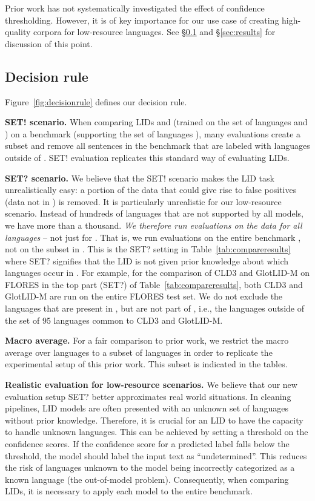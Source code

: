 \documentclass[11pt]{article}
\newcommand{\basequ}{SET?\xspace}
\newcommand{\baseex}{SET!\xspace}
\def\modelname{\mbox{GlotLID-M}\xspace}
\def\flores{FLORES\xspace}
\def\figref#1{Figure~\ref{fig:#1}}
\def\tabref#1{Table~\ref{tab:#1}}
\def\seclabel#1{\label{sec:#1}\label{p:#1}}
\def\secref#1{\S\ref{sec:#1}}
\begin{document}
Prior work has not systematically
investigated the effect of confidence thresholding. However, it is of key
importance for our
use case of creating high-quality corpora for low-resource
languages. See \secref{result-scenario}
and \secref{results} for discussion of this point.


\subsection{Decision rule}\seclabel{result-scenario}
\figref{decisionrule} defines our decision rule.



\textbf{\baseex scenario.} When comparing LIDs 
and  (trained on the set of languages  and )
on a benchmark  (supporting the set of languages ),
many evaluations  create a  subset
 and remove all sentences in the
benchmark that are labeled with languages outside of
.
\baseex evaluation
replicates this standard way of evaluating LIDs.


\textbf{\basequ scenario.} 
We believe that the \baseex scenario makes the LID task
unrealistically easy: a portion of the
data that could give rise to false positives
(data   not in )
is removed.
It is particularly unrealistic for our low-resource
scenario. Instead of hundreds of languages that are not
supported by all models, we have
more than a thousand. \emph{We therefore run
evaluations on the data for all languages} -- not just for
. That
is, we run evaluations on the entire benchmark , not on
the subset in .
This is the \basequ setting in \tabref{compareresults} where
\basequ signifies that the LID is not given prior knowledge
about which languages occur in .
For example, for the comparison of CLD3 and \modelname on \flores
in the top part (\basequ) of \tabref{compareresults}, both CLD3 and \modelname are run on
the entire \flores test set. We do not exclude
the languages that are present in , but are not part of ,
i.e., the languages
outside of the set of 95 languages common to CLD3 and
\modelname.




\textbf{Macro average.}
For a fair comparison to prior work,
we restrict 
the macro average over languages to a subset of languages in
order to replicate the experimental setup of this prior
work.
This subset is indicated in the tables.

\textbf{Realistic evaluation for low-resource scenarios.}
We believe that our new evaluation setup \basequ better
approximates real world situations. In cleaning pipelines, LID
models are often presented with an unknown set of languages
without prior knowledge. Therefore, it is crucial for an LID
to have the capacity to handle unknown languages. This
can be achieved by setting a threshold  on the
confidence scores. If the confidence score for a predicted
label falls below the threshold, the model should label
the input text as ``undetermined''. This reduces the
risk of languages unknown to the model being incorrectly
categorized as a known language (the out-of-model problem).
Consequently, when comparing LIDs, it is necessary to apply
each model to the entire benchmark.
\end{document}
